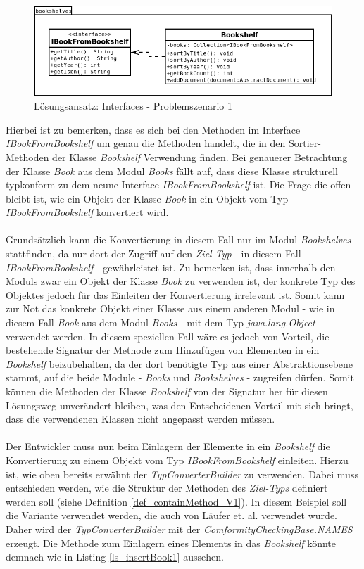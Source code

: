 \documentclass[11pt, 
ngerman,
doublespacing,
chapterinoneline, %
consistentlayout, %
]{scrartcl}
\begin{document}
\begin{figure}[h]
\centering
\includegraphics[scale=0.5]{pics/loesung_s1_interface.png}
\caption{Lösungsansatz: Interfaces - Problemszenario 1}
\label{solveInterface_PS1}
\end{figure} 
Hierbei ist zu bemerken, dass es sich bei den Methoden im Interface \emph{IBookFromBookshelf} um genau die Methoden handelt, die in den Sortier-Methoden der Klasse \emph{Bookshelf} Verwendung finden. Bei genauerer Betrachtung der Klasse \emph{Book} aus dem Modul \emph{Books} fällt auf, dass diese Klasse strukturell typkonform zu dem neune Interface \emph{IBookFromBookshelf} ist. Die Frage die offen bleibt ist, wie ein Objekt der Klasse \emph{Book} in ein Objekt vom Typ \emph{IBookFromBookshelf} konvertiert wird.\\\\
Grundsätzlich kann die Konvertierung in diesem Fall nur im Modul \emph{Bookshelves} stattfinden, da nur dort der Zugriff auf den \emph{Ziel-Typ} - in diesem Fall \emph{IBookFromBookshelf} - gewährleistet ist. Zu bemerken ist, dass innerhalb den Moduls zwar ein Objekt der Klasse \emph{Book} zu verwenden ist, der konkrete Typ des Objektes jedoch für das Einleiten der Konvertierung irrelevant ist. Somit kann zur Not das konkrete Objekt einer Klasse aus einem anderen Modul - wie in diesem Fall \emph{Book} aus dem Modul \emph{Books} - mit dem Typ \emph{java.lang.Object} verwendet werden. In diesem speziellen Fall wäre es jedoch von Vorteil, die bestehende Signatur der Methode zum Hinzufügen von Elementen in ein \emph{Bookshelf} beizubehalten, da der dort benötigte Typ aus einer Abstraktionsebene stammt, auf die beide Module - \emph{Books} und \emph{Bookshelves} - zugreifen dürfen. Somit können die Methoden der Klasse \emph{Bookshelf} von der Signatur her für diesen Lösungsweg unverändert bleiben, was den Entscheidenen Vorteil mit sich bringt, dass die verwendenen Klassen nicht angepasst werden müssen.\\\\
Der Entwickler muss nun beim Einlagern der Elemente in ein \emph{Bookshelf} die Konvertierung zu einem Objekt vom Typ \emph{IBookFromBookshelf} einleiten. Hierzu ist, wie oben bereits erwähnt der \emph{TypConverterBuilder} zu verwenden. Dabei muss entschieden werden, wie die Struktur der Methoden des \emph{Ziel-Typs} definiert werden soll (siehe Definition \ref{def_containMethod_V1}). In diesem Beispiel soll die Variante verwendet werden, die auch von Läufer et. al. \cite{structconfjava} verwendet wurde. Daher wird der \emph{TypConverterBuilder} mit der \emph{ComformityCheckingBase.NAMES} erzeugt. Die Methode zum Einlagern eines Elements in das \emph{Bookshelf} könnte demnach wie in Listing \ref{ls_insertBook1} aussehen.
\end{document}
